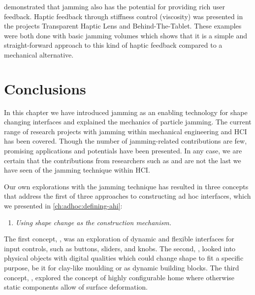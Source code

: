\citet{follmer2012jamming} demonstrated that jamming also has the potential for providing rich user feedback. 
Haptic feedback through stiffness control (viscosity) was presented in the projects Transparent Haptic Lens and Behind-The-Tablet.
These examples were both done with basic jamming volumes which shows that it is a simple and straight-forward approach to this kind of haptic feedback compared to a mechanical alternative.





\section{Conclusions}
In this chapter we have introduced jamming as an enabling technology for shape changing interfaces and explained the mechanics of particle jamming.
The current range of research projects with jamming within mechanical engineering and HCI has been covered.
Though the number of jamming-related contributions are few, promising applications and potentials have been presented.
In any case, we are certain that the contributions from researchers such as \citet{follmer2012jamming} and \citet{matoba2012claytricsurface} are not the last we have seen of the jamming technique within HCI.

Our own explorations with the jamming technique has resulted in three concepts that address the first of three approaches to constructing ad hoc interfaces, which we presented in \autoref{ch:adhoc:defining-ahi}:
\begin{enumerate}
	\item{\emph{Using shape change as the construction mechanism.}}
\end{enumerate}
The first concept, \emph{}, was an exploration of dynamic and flexible interfaces for input controls, such as buttons, sliders, and knobs.
The second, \emph{}, looked into physical objects with digital qualities which could change shape to fit a specific purpose, be it for clay-like moulding or as dynamic building blocks.
The third concept, \emph{}, explored the concept of highly configurable home where otherwise static components allow of surface deformation.
